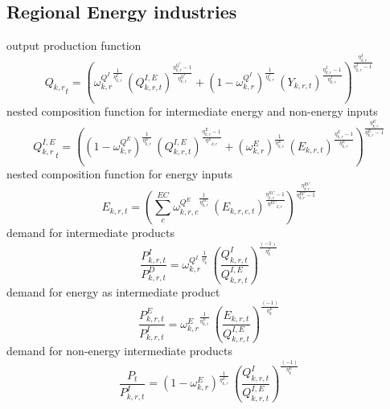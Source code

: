 \subsection{Regional Energy industries}
output production function
\begin{dmath}
{{Q_{k,r}}_{t}}= \left({{\omega^{Q^{I}}_{k,r}}}^{\frac{1}{{{\eta^{I}_{k,r}}}}}\, \left(Q^{I,E}_{k,r,t}\right)^{\frac{{{\eta^{Q^{I}}_{k,r}}}-1}{{{\eta^{Q^{I}}_{k,r}}}}}+\left(1 - {{\omega^{Q^{I}}_{k,r}}} \right)^{\frac{1}{{{\eta^{I}_{k,r}}}}} \, \left(Y_{k,r,t}\right)^{\frac{{{\eta^{I}_{k,r}}}-1}{{{\eta^{I}_{k,r}}}}}\right)^{\frac{{{\eta^{I}_{k,r}}}}{{{\eta^{I}_{k,r}}}-1}}
\end{dmath}
nested composition function for intermediate energy and non-energy inputs
\begin{dmath}
{{Q^{I,E}_{k,r}}_{t}}= \left(({1-\omega^{Q^{E}}_{k,r}})^{\frac{1}{{{\eta^{E}_{k,r}}}}} \, \left(Q^{I,E}_{k,r,t}\right)^{\frac{{{\eta^{E}_{k,r}}}-1}{{{\eta^{E}}_{k,r}}}}+\left(\omega^{E}_{k,r} \right)^{\frac{1}{{{\eta^{E}_{k,r}}}}} \, \left(E_{k,r,t}\right)^{\frac{{{\eta^{E}_{k,r}}}-1}{{{\eta^{E}_{k,r}}}}}\right)^{\frac{{{\eta^{E}_{k,r}}}}{{{\eta^{E}_{k,r}}}-1}} \label{eq:energyintermediatecomposite}
\end{dmath}
nested composition function for energy inputs
\begin{dmath}
E_{k,r,t}= \left( \sum_{c}^{EC} {\omega^{Q^{E}}_{k,r,c}}^{\frac{1}{{{\eta^{EC}_{k,r}}}}}\, \left(E_{k,r,c,t}\right)^{\frac{{{\eta^{EC}_{k,r}}}-1}{{{\eta^{EC}}_{k,r}}}}\right)^{\frac{{{\eta^{EC}_{k,r}}}}{{{\eta^{EC}_{k,r}}}-1}} \label{eq:energycomposite}
\end{dmath}
demand for intermediate products
\begin{dmath}
\frac{{P^{I}_{k,r,t}}}{{P^{D}_{k,r,t}}}={\omega^{Q^{I}}_{k,r}}^{\frac{1}{{{\eta^{I}_{k}}}}} \, \left(\frac{Q^{I}_{k,r,t}}{Q^{I,E}_{k,r,t}}\right)^{\frac{\left(-1\right)}{{{\eta^{I}_{k}}}}}
\end{dmath}
demand for energy as intermediate product
\begin{dmath}
\frac{{P^{E}_{k,r,t}}}{{P^{I}_{k,r,t}}}={\omega^{E}_{k,r}}^{\frac{1}{{{\eta^{E}_{k,r}}}}} \, \left(\frac{E_{k,r,t}}{Q^{I,E}_{k,r,t}}\right)^{\frac{\left(-1\right)}{{{\eta^{E}_{k}}}}}
\end{dmath}
demand for non-energy intermediate products
\begin{dmath}
\frac{P_{t}}{P^{I}_{k,r,t}} = (1 - \omega^{E}_{k,r})^{\frac{1}{{{\eta^{E}_{k,r}}}}} \, \left(\frac{Q^{I}_{k,r,t}}{Q^{I,E}_{k,r,t}}\right)^{\frac{\left(-1\right)}{{{\eta^{E}_{k}}}}}
\end{dmath}


